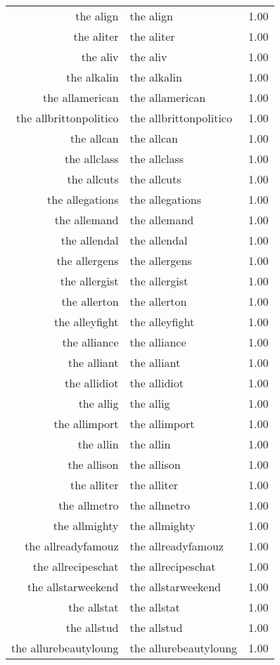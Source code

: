 \begin{table}[ht]
\begin{tabular}{rlr}
  the align & the align & 1.00 \\ 
  the aliter & the aliter & 1.00 \\ 
  the aliv & the aliv & 1.00 \\ 
  the alkalin & the alkalin & 1.00 \\ 
  the allamerican & the allamerican & 1.00 \\ 
  the allbrittonpolitico & the allbrittonpolitico & 1.00 \\ 
  the allcan & the allcan & 1.00 \\ 
  the allclass & the allclass & 1.00 \\ 
  the allcuts & the allcuts & 1.00 \\ 
  the allegations & the allegations & 1.00 \\ 
  the allemand & the allemand & 1.00 \\ 
  the allendal & the allendal & 1.00 \\ 
  the allergens & the allergens & 1.00 \\ 
  the allergist & the allergist & 1.00 \\ 
  the allerton & the allerton & 1.00 \\ 
  the alleyfight & the alleyfight & 1.00 \\ 
  the alliance & the alliance & 1.00 \\ 
  the alliant & the alliant & 1.00 \\ 
  the allidiot & the allidiot & 1.00 \\ 
  the allig & the allig & 1.00 \\ 
  the allimport & the allimport & 1.00 \\ 
  the allin & the allin & 1.00 \\ 
  the allison & the allison & 1.00 \\ 
  the alliter & the alliter & 1.00 \\ 
  the allmetro & the allmetro & 1.00 \\ 
  the allmighty & the allmighty & 1.00 \\ 
  the allreadyfamouz & the allreadyfamouz & 1.00 \\ 
  the allrecipeschat & the allrecipeschat & 1.00 \\ 
  the allstarweekend & the allstarweekend & 1.00 \\ 
  the allstat & the allstat & 1.00 \\ 
  the allstud & the allstud & 1.00 \\ 
  the allurebeautyloung & the allurebeautyloung & 1.00 \\ 

\end{tabular}
\end{table}
